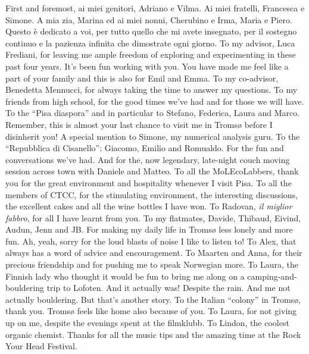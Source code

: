 First and foremost, \textitalian{ai miei genitori,
Adriano e Vilma. Ai miei fratelli, Francesca e Simone. A mia zia, Marina
ed ai miei nonni, Cherubino e Irma, Maria e Piero. Questo è dedicato a
voi, per tutto quello che mi avete insegnato, per il sostegno continuo e
la pazienza infinita che dimostrate ogni giorno.}
To my advisor, Luca Frediani, for leaving me ample freedom of exploring
and experimenting in these past four years.
It's been fun working with you. You have made me feel like a part of
your family and this is also for Emil and Emma.
To my co-advisor, Benedetta Mennucci, for always taking the time to
answer my questions.
To my friends from high school, for the good times we've had and for
those we will have.
To the \enquote{Pisa diaspora} and in particular to Stefano, Federica,
Laura and Marco. Remember, this is almost your last chance to visit me in Tromsø
before I disinherit you!
A special mention to Simone, my numerical analysis guru.
To the \enquote{Repubblica di Cisanello}: Giacomo, Emilio and Romualdo.
For the fun and conversations we've had. And for the, now legendary,
late-night couch moving session across town with Daniele and Matteo.
To all the MoLEcoLabbers, thank you for the great environment and
hospitality whenever I visit Pisa.
To all the members of CTCC, for the stimulating environment, the
interesting discussions, the excellent cakes and all the wine bottles I
have won.
To Radovan, \emph{il miglior fabbro}, for all I have learnt
from you.
To my flatmates, Davide, Thibaud, Eivind, Audun, Jenn and JB. For making
my daily life in Tromsø less lonely and more fun.
Ah, yeah, sorry for the loud blasts of noise I like to listen to!
To Alex, that always has a word of advice and encouragement.
To Maarten and Anna, for their precious friendship and for pushing me to
speak Norwegian more.
To Laura, the Finnish lady who thought it would be fun to bring me along
on a camping-and-bouldering trip to Lofoten. And it actually was!
Despite the rain. And me not actually bouldering. But that's another
story.
To the Italian \enquote{colony} in Tromsø, thank you. Tromsø feels like
home also because of you.
To Laura, for not giving up on me, despite the evenings spent at the
filmklubb.
To Lindon, the coolest organic chemist. Thanks for all the music tips
and the amazing time at the Rock Your Head Festival.
